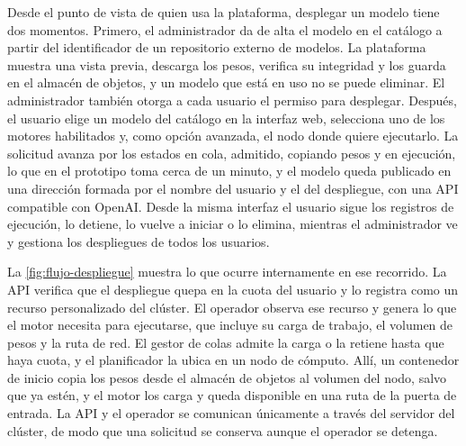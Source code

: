 Desde el punto de vista de quien usa la plataforma, desplegar un modelo tiene dos momentos. Primero, el administrador da de alta el modelo en el catálogo a partir del identificador de un repositorio externo de modelos. La plataforma muestra una vista previa, descarga los pesos, verifica su integridad y los guarda en el almacén de objetos, y un modelo que está en uso no se puede eliminar. El administrador también otorga a cada usuario el permiso para desplegar. Después, el usuario elige un modelo del catálogo en la interfaz web, selecciona uno de los motores habilitados y, como opción avanzada, el nodo donde quiere ejecutarlo. La solicitud avanza por los estados en cola, admitido, copiando pesos y en ejecución, lo que en el prototipo toma cerca de un minuto, y el modelo queda publicado en una dirección formada por el nombre del usuario y el del despliegue, con una API compatible con OpenAI. Desde la misma interfaz el usuario sigue los registros de ejecución, lo detiene, lo vuelve a iniciar o lo elimina, mientras el administrador ve y gestiona los despliegues de todos los usuarios.

La \cref{fig:flujo-despliegue} muestra lo que ocurre internamente en ese recorrido. La API verifica que el despliegue quepa en la cuota del usuario y lo registra como un recurso personalizado del clúster. El operador observa ese recurso y genera lo que el motor necesita para ejecutarse, que incluye su carga de trabajo, el volumen de pesos y la ruta de red. El gestor de colas admite la carga o la retiene hasta que haya cuota, y el planificador la ubica en un nodo de cómputo. Allí, un contenedor de inicio copia los pesos desde el almacén de objetos al volumen del nodo, salvo que ya estén, y el motor los carga y queda disponible en una ruta de la puerta de entrada. La API y el operador se comunican únicamente a través del servidor del clúster, de modo que una solicitud se conserva aunque el operador se detenga.

